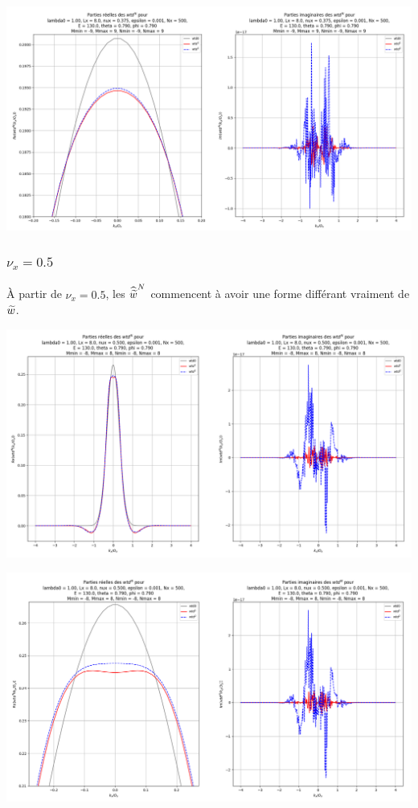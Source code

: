 \includegraphics[scale=0.35]{2-1.png}

\newpage

\subsubsection{$\nu_x = 0.5$}

À partir de $\nu_x = 0.5$, les $\widehat{\widetilde{w}}^N$ commencent à avoir une forme différant vraiment de $\widetilde{w}$.


\includegraphics[scale=0.4]{3.png}

\includegraphics[scale=0.4]{3-1.png}


